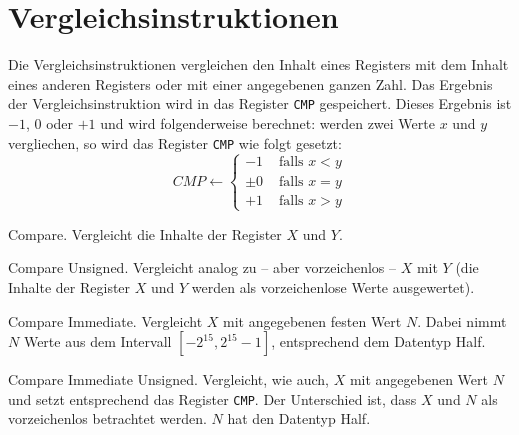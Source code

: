 \section{Vergleichsinstruktionen}
\label{sec:Vergleichsinstruktionen}

Die Vergleichsinstruktionen vergleichen den Inhalt eines Registers mit dem
Inhalt eines anderen Registers oder mit einer angegebenen ganzen Zahl. Das
Ergebnis der Vergleichsinstruktion wird in das Register \texttt{CMP}
gespeichert. Dieses Ergebnis ist $-1$, $0$ oder $+1$ und wird folgenderweise
berechnet:
werden zwei Werte $x$ und $y$ vergliechen, so wird das Register \texttt{CMP}
wie folgt gesetzt:
\[
    CMP \gets
    \begin{cases}
        -1 & \text{ falls } x < y  \\
     \pm 0 & \text{ falls } x = y  \\
        +1 & \text{ falls } x > y 
    \end{cases}
\]

\glqq Compare\grqq.
Vergleicht die Inhalte der Register $X$ und $Y$.


\glqq Compare Unsigned\grqq.
Vergleicht analog zu  -- aber vorzeichenlos -- $X$ mit $Y$
(die Inhalte der Register $X$ und $Y$ werden als vorzeichenlose Werte
ausgewertet).


\glqq Compare Immediate\grqq. 
Vergleicht $X$ mit angegebenen festen Wert $N$.
Dabei nimmt $N$ Werte aus dem Intervall
$[-2^{15}, 2^{15}-1]$, entsprechend dem Datentyp \glqq Half\grqq.


\glqq Compare Immediate Unsigned\grqq.
Vergleicht, wie  auch, $X$ mit angegebenen Wert $N$ und setzt
entsprechend das Register \texttt{CMP}.
Der Unterschied ist, dass $X$ und $N$ als vorzeichenlos betrachtet werden.
$N$ hat den Datentyp \glqq Half\grqq.

